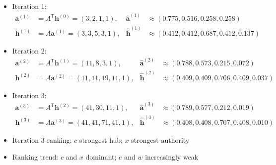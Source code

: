 \begin{itemize}
    \item Iteration 1:
          \[
              \begin{aligned}
                  \mathbf{a}^{(1)} & = A^\mathsf{T}\mathbf{h}^{(0)}=(3,2,1,1),
                                   & \widehat{\mathbf{a}}^{(1)}                & \approx(0.775,0.516,0.258,0.258)       \\
                  \mathbf{h}^{(1)} & = A\mathbf{a}^{(1)}=(3,3,5,3,1),
                                   & \widehat{\mathbf{h}}^{(1)}                & \approx(0.412,0.412,0.687,0.412,0.137)
              \end{aligned}
          \]

    \item Iteration 2:
          \[
              \begin{aligned}
                  \mathbf{a}^{(2)} & = A^\mathsf{T}\mathbf{h}^{(1)}=(11,8,3,1),
                                   & \widehat{\mathbf{a}}^{(2)}                 & \approx(0.788,0.573,0.215,0.072)       \\
                  \mathbf{h}^{(2)} & = A\mathbf{a}^{(2)}=(11,11,19,11,1),
                                   & \widehat{\mathbf{h}}^{(2)}                 & \approx(0.409,0.409,0.706,0.409,0.037)
              \end{aligned}
          \]

    \item Iteration 3:
          \[
              \begin{aligned}
                  \mathbf{a}^{(3)} & = A^\mathsf{T}\mathbf{h}^{(2)}=(41,30,11,1),
                                   & \widehat{\mathbf{a}}^{(3)}                   & \approx(0.789,0.577,0.212,0.019)       \\
                  \mathbf{h}^{(3)} & = A\mathbf{a}^{(3)}=(41,41,71,41,1),
                                   & \widehat{\mathbf{h}}^{(3)}                   & \approx(0.408,0.408,0.707,0.408,0.010)
              \end{aligned}
          \]
\end{itemize}

\begin{itemize}
    \item Iteration 3 ranking: \(c\) strongest hub; \(x\) strongest authority
    \item Ranking trend: \(c\) and \(x\) dominant; \(e\) and \(w\) increasingly weak
\end{itemize}

